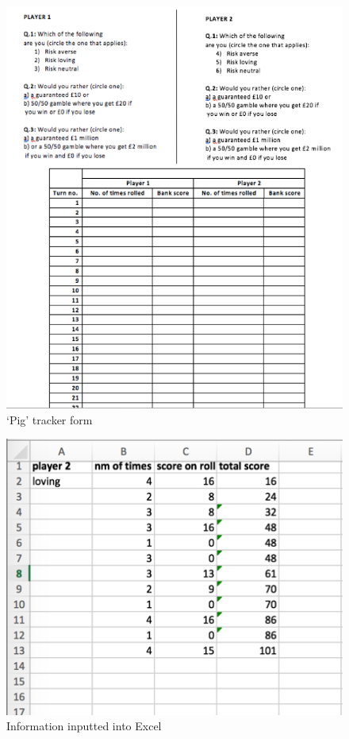 \documentclass[a4paper,titlepage]{article}
\begin{document}
\begin{figure}
\center
\includegraphics[scale=1]{pig_tracker_form}
\caption{`Pig' tracker form\label{figure5}}
\end{figure}
\begin{figure}
\center
\includegraphics[scale=1]{excel_1}
\caption{Information inputted into Excel\label{figure6}}
\end{figure}
\end{document}
